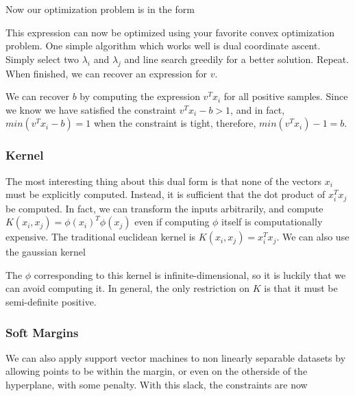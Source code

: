 \documentclass[12pt]{article}
\begin{document}
Now our optimization problem is in the form

This expression can now be optimized using your favorite convex optimization problem. One simple algorithm which works well is dual coordinate ascent. Simply select two $\lambda_i$ and $\lambda_j$ and line search greedily for a better solution. Repeat. When finished, we can recover an expression for $v$.

We can recover $b$ by computing the expression $v^Tx_i$ for all positive samples. Since we know we have satisfied the constraint $v^Tx_i - b > 1$, and in fact, $min(v^Tx_i -b) = 1$ when the constraint is tight, therefore, $min(v^Tx_i)-1 = b$. 

\subsubsection{Kernel}

The most interesting thing about this dual form is that none of the vectors $x_i$ must be explicitly computed. Instead, it is sufficient that the dot product of $x_i^T x_j$ be computed. In fact, we can transform the inputs arbitrarily, and compute $K(x_i, x_j) = \phi(x_i)^T \phi(x_j)$ even if computing $\phi$ itself is computationally expensive. The traditional euclidean kernel is $K(x_i, x_j) = x_i^Tx_j$. We can also use the gaussian kernel


The $\phi$ corresponding to this kernel is infinite-dimensional, so it is luckily that we can avoid computing it. In general, the only restriction on $K$ is that it must be semi-definite positive.

\subsubsection{Soft Margins}

We can also apply support vector machines to non linearly separable datasets by allowing points to be within the margin, or even on the otherside of the hyperplane, with some penalty. With this slack, the constraints are now

\end{document}
